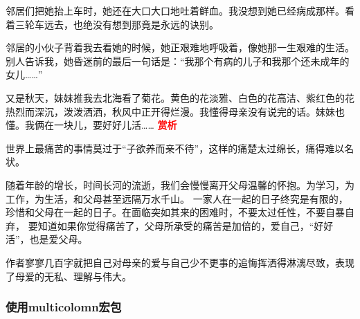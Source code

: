 \documentclass[fontset=windows, 12pt]{article}
\newcommand{\red}[1]{\textcolor{red}{#1}}
\begin{document}
邻居们把她抬上车时，她还在大口大口地吐着鲜血。我没想到她已经病成那样。看着三轮车远去，也绝没有想到那竟是永远的诀别。

邻居的小伙子背着我去看她的时候，她正艰难地呼吸着，像她那一生艰难的生活。别人告诉我，她昏迷前的最后一句话是：“我那个有病的儿子和我那个还未成年的女儿……”

又是秋天，妹妹推我去北海看了菊花。黄色的花淡雅、白色的花高洁、紫红色的花热烈而深沉，泼泼洒洒，秋风中正开得烂漫。我懂得母亲没有说完的话。妹妹也懂。我俩在一块儿，要好好儿活……
\clearpage
\onecolumn
\red{\textbf{赏析}}\par
{
    \kaishu
    世界上最痛苦的事情莫过于“子欲养而亲不待”，这样的痛楚太过绵长，痛得难以名状。

    随着年龄的增长，时间长河的流逝，我们会慢慢离开父母温馨的怀抱。为学习，为工作，为生活，和父母甚至远隔万水千山。
    一家人在一起的日子终究是有限的，珍惜和父母在一起的日子。在面临突如其来的困难时，不要太过任性，不要自暴自弃，
    要知道如果你觉得痛苦了，父母所承受的痛苦是加倍的，爱自己，“好好活”，也是爱父母。

    作者寥寥几百字就把自己对母亲的爱与自己少不更事的追悔挥洒得淋漓尽致，表现了母爱的无私、理解与伟大。
}
\newpage

\subsubsection{使用multicolomn宏包}

\end{document}
